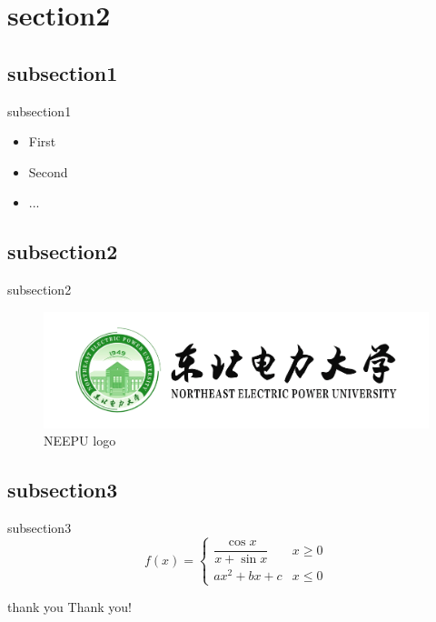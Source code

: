 \documentclass[UTF8,11pt]{beamer}
\begin{document}
\section{section2}
\subsection{subsection1}
\begin{frame}{subsection1}
	\begin{itemize}[<+->]
		\item First
		\item Second
		\item ...
	\end{itemize}
\end{frame}

\subsection{subsection2}
\begin{frame}{subsection2}
	\begin{figure}[htbp]
		\includegraphics[scale=0.1]{figure/neepu_logo}
		\caption{NEEPU logo}
	\end{figure}
\end{frame}


\subsection{subsection3}
\begin{frame}{subsection3}
	\begin{equation}
	f(x) = 
	\begin{cases}
	\dfrac{\cos{x}}{x+\sin{x}} & x \geq 0 \\
	ax^2+bx+c & x \leq 0
	\end{cases}
	\end{equation}
\end{frame}


\begin{frame}{thank you}
	\centering \calligra {} Thank you!
\end{frame}
\end{document}
